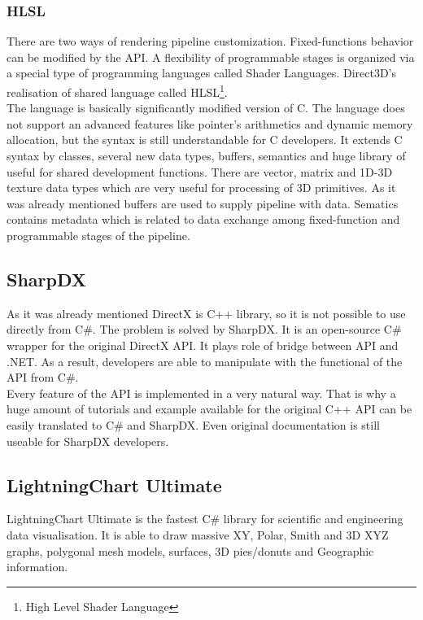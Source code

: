 \documentclass[twoside, english, 11pt]{report}
\begin{document}
\subsubsection{HLSL}
There are two ways of rendering pipeline customization. Fixed-functions behavior can be modified by the API. A flexibility of programmable stages  is organized via a special type of programming languages called Shader Languages. Direct3D's realisation of shared language called HLSL\footnote{High Level Shader Language}.\\

The language is basically significantly modified version of C. The language does not support an advanced features like pointer's arithmetics and dynamic memory allocation, but the syntax is still understandable for C developers. It extends C syntax by classes, several new data types, buffers, semantics and huge library of useful for shared development functions. There are vector, matrix and 1D-3D texture data types which are very useful for processing of 3D primitives. As it was already mentioned buffers are used to supply pipeline with data. Sematics contains metadata which is related to data exchange among fixed-function and programmable stages of the pipeline.
\subsection{SharpDX}

As it was already mentioned DirectX is C++ library, so it is not possible to use directly from C\#. The problem is solved by SharpDX. It is an open-source C\# wrapper for the original DirectX API. It plays role of bridge between API and .NET. As a result, developers are able to manipulate with the functional of the API from C\#.\\

Every feature of the API is implemented in a very natural way. That is why a huge amount of tutorials and example available for the original C++ API can be easily translated to C\# and SharpDX. Even original documentation is still useable for SharpDX developers.

\subsection{LightningChart Ultimate}

LightningChart Ultimate is the fastest C\# library for scientific and engineering data visualisation. It is able to draw massive XY, Polar, Smith and 3D XYZ graphs, polygonal mesh models, surfaces, 3D pies/donuts and Geographic information. 
\end{document}
